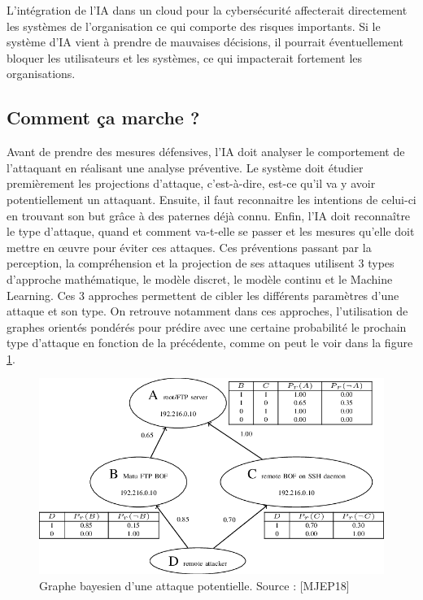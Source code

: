 \documentclass[a4paper, 12pt]{article}
\begin{document}
      L’intégration de l’IA dans un cloud pour la cybersécurité affecterait
      directement les systèmes de l’organisation ce qui comporte des risques
      importants. Si le système d'IA vient à prendre de mauvaises décisions, il
      pourrait éventuellement bloquer les utilisateurs et les systèmes, ce qui
      impacterait fortement les organisations.

    \subsection{Comment ça marche ?}
      Avant de prendre des mesures défensives, l’IA doit analyser le
      comportement de l’attaquant en réalisant une analyse préventive. Le
      système doit étudier premièrement les projections d’attaque, c’est-à-dire,
      est-ce qu’il va y avoir potentiellement un attaquant. Ensuite, il faut
      reconnaitre les intentions de celui-ci en trouvant son but grâce à des
      paternes déjà connu. Enfin, l’IA doit reconnaître le type d’attaque, quand
      et comment va-t-elle se passer et les mesures qu’elle doit mettre en œuvre
      pour éviter ces attaques. Ces préventions passant par la perception, la
      compréhension et la projection de ses attaques utilisent 3 types
      d’approche mathématique, le modèle discret, le modèle continu et le
      Machine Learning. Ces 3 approches permettent de cibler les différents
      paramètres d’une attaque et son type. On retrouve notamment dans ces
      approches, l’utilisation de graphes orientés pondérés pour prédire avec
      une certaine probabilité le prochain type d’attaque en fonction de la
      précédente, comme on peut le voir dans la figure \ref{fig:1}. \\

      \begin{figure}[h]
        \centering
        \includegraphics[scale=.4]{img/attackgraph.png}
        \caption{Graphe bayesien d’une attaque potentielle. Source : [MJEP18]}
        \label{fig:1}
      \end{figure}
\end{document}
